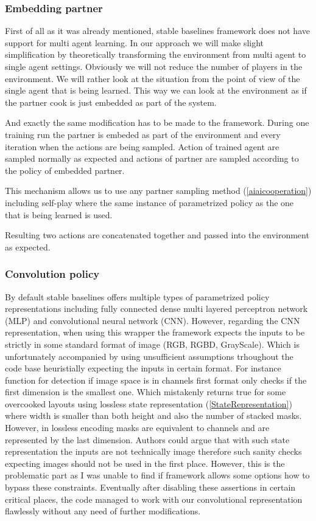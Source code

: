 \subsubsection*{Embedding partner}
First of all as it was already mentioned, stable baselines framework does not have support for multi agent learning.
In our approach we will make slight simplification by theoretically transforming the environment from multi agent to single agent settings.
Obviously we will not reduce the number of players in the environment.
We will rather look at the situation from the point of view of the single agent that is being learned. 
This way we can look at the environment as if the partner cook is just embedded as part of the system.

And exactly the same modification has to be made to the framework.
During one training run the partner is embeded as part of the environment and every iteration when the actions are being sampled.
Action of trained agent are sampled normally as expected and actions of partner are sampled according to the policy of embedded partner.

This mechanism allows us to use any partner sampling method (\ref{aiaicooperation}) including self-play where the same instance of parametrized policy as the one that is being learned is used.

Resulting two actions are concatenated together and passed into the environment as expected.

\subsubsection*{Convolution policy}
By default stable baselines offers multiple types of parametrized policy representations including fully connected dense multi layered perceptron network (MLP) and convolutional neural network (CNN).
However, regarding the CNN representation, when using this wrapper the framework expects the inputs to be strictly in some standard format of image (RGB, RGBD, GrayScale).
Which is unfortunately accompanied by using unsufficient assumptions trhoughout the code base heuristially expecting the inputs in certain format.
For instance function for detection if image space is in channels first format only checks if the first dimension is the smallest one.
Which mistakenly returns true for some overcooked layouts using lossless state representation (\ref{StateRepresentation}) where width is smaller than both height and also the number of stacked masks.
However, in lossless encoding masks are equivalent to channels and are represented by the last dimension.
Authors could argue that with such state representation the inputs are not technically image therefore such sanity checks expecting images should not be used in the first place.
However, this is the problematic part as I was unable to find if framework allows some options how to bypass these constraints.
Eventually after disabling these assertions in certain critical places, the code managed to work with our convolutional representation flawlessly without any need of further modifications.  

